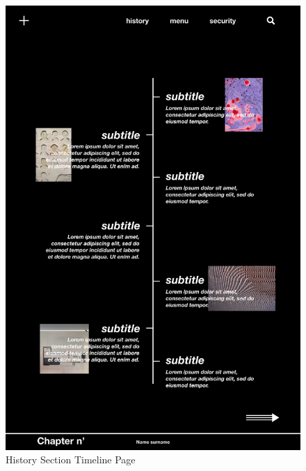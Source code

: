 \documentclass[a4paper,10pt]{article}
\begin{document}
\begin{figure}[p]
\includegraphics[height=0.52\paperheight, center]{history_timeline_article_page.jpeg}
\caption{History Section Timeline Page}
\end{figure}
\end{document}
